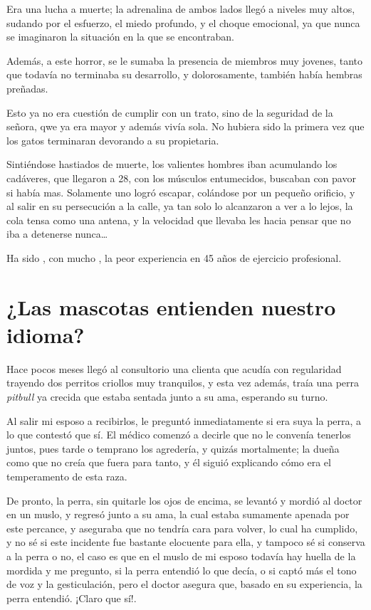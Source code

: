 \documentclass[letterpaper, 12pt]{book}
\begin{document}
Era una lucha a muerte; la adrenalina de ambos lados llegó a niveles muy altos, sudando por el esfuerzo, el miedo profundo, y el choque emocional, ya que nunca se imaginaron la situación en la que se encontraban.

Además, a este horror, se le sumaba la presencia de miembros muy jovenes, tanto que todavía no terminaba su desarrollo, y dolorosamente, también había hembras preñadas.

Esto ya no era cuestión de cumplir con un trato, sino de la seguridad de la señora, qwe ya era mayor y además vivía sola. No hubiera sido la primera vez que los gatos terminaran devorando a su propietaria.

Sintiéndose hastiados de muerte, los valientes hombres iban acumulando los cadáveres, que llegaron a 28, con los músculos entumecidos, buscaban con pavor si había mas. Solamente uno logró escapar, colándose por un pequeño orificio, y al salir en su persecución a la calle, ya tan solo lo alcanzaron a ver a lo lejos, la cola tensa como una antena, y la velocidad que llevaba les hacia pensar que no iba a detenerse nunca\ldots

Ha sido , con mucho , la peor experiencia en 45 años de ejercicio profesional.

\chapter{¿Las mascotas entienden nuestro idioma?}
Hace pocos meses llegó al consultorio una clienta que acudía con regularidad trayendo dos perritos criollos muy tranquilos, y esta vez además, traía una perra {\it pitbull} ya crecida que estaba sentada junto a su ama, esperando su turno.

Al salir mi esposo a recibirlos, le preguntó inmediatamente si era suya la perra, a lo que contestó que sí. El médico comenzó a decirle que no le convenía tenerlos juntos, pues tarde o temprano los agredería, y quizás mortalmente; la dueña como que no creía que fuera para tanto, y él siguió explicando cómo era el temperamento de esta raza.

De pronto, la perra, sin quitarle los ojos de encima, se levantó y mordió al doctor en un muslo, y regresó junto a su ama, la cual estaba sumamente apenada por este percance, y aseguraba que no tendría cara para volver, lo cual ha cumplido, y no sé si este incidente fue bastante elocuente para ella, y tampoco sé si conserva a la perra o no, el caso es que en el muslo de mi esposo todavía hay huella de la mordida y me pregunto, si la perra entendió lo que decía, o si captó más el tono de voz y la gesticulación, pero el doctor asegura que, basado en su experiencia, la perra entendió. ¡Claro que sí!.
\end{document}
